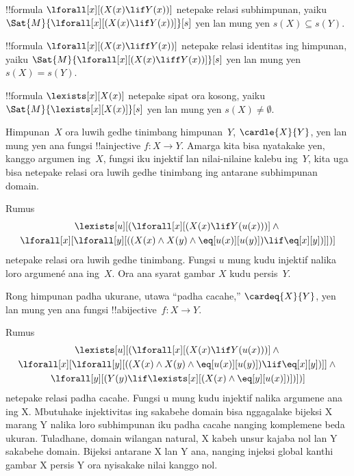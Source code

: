 \documentclass[../../../include/open-logic-section]{subfiles}
\begin{document}


\begin{prop}
!!{formula} $\lforall[x][(X(x) \lif Y(x))]$ netepake relasi
subhimpunan, yaiku
$\Sat{M}{\lforall[x][(X(x) \lif Y(x))]}[s]$
yen lan mung yen $s(X) \subseteq s(Y)$.
\end{prop}

\begin{prop}
!!{formula} $\lforall[x][(X(x) \liff Y(x))]$ netepake relasi
identitas ing himpunan, yaiku
$\Sat{M}{\lforall[x][(X(x) \liff Y(x))]}[s]$
yen lan mung yen $s(X) = s(Y)$.
\end{prop}

\begin{prop}
!!{formula} $\lexists[x][X(x)]$ netepake sipat ora kosong,
yaiku $\Sat{M}{\lexists[x][X(x)]}[s]$ yen lan mung yen
$s(X) \neq \emptyset$.
\end{prop}

Himpunan~$X$ ora luwih gedhe tinimbang himpunan~$Y$,
$\cardle{X}{Y}$, yen lan mung yen ana fungsi
!!a{injective} $f\colon X \to Y$. Amarga kita bisa
nyatakake yen, kanggo argumen ing~$X$, fungsi iku injektif
lan nilai-nilaine kalebu ing~$Y$, kita uga bisa
netepake relasi ora luwih gedhe tinimbang ing antarane
subhimpunan domain.

\begin{prop}
Rumus
\begin{multline*}
\lexists[u][(\lforall[x][(X(x) \lif Y(u(x)))] \land {}\\
\lforall[x][\lforall[y][((X(x) \land X(y) \land \eq[u(x)][u(y)]) \lif
      \eq[x][y])]])]
\end{multline*}
netepake relasi ora luwih gedhe tinimbang. Fungsi $u$ mung kudu injektif nalika loro argumené ana ing~$X$. Ora ana syarat gambar $X$ kudu persis~$Y$.
\end{prop}

Rong himpunan padha ukurane, utawa ``padha cacahe,''
$\cardeq{X}{Y}$, yen lan mung yen ana fungsi
!!a{bijective}~$f\colon X \to Y$.

\begin{prop}
Rumus
\begin{multline*}
  \lexists[u][(\lforall[x][(X(x) \lif Y(u(x)))] \land {}\\
    \lforall[x][\lforall[y][((X(x) \land X(y) \land \eq[u(x)][u(y)]) \lif \eq[x][y])]]
  \land {} \\\lforall[y][(Y(y) \lif \lexists[x][(X(x)
      \land \eq[y][u(x)])])])]
\end{multline*}
netepake relasi padha cacahe. Fungsi u mung kudu injektif nalika argumene ana ing X. Mbutuhake injektivitas ing sakabehe domain bisa nggagalake bijeksi X marang Y nalika loro subhimpunan iku padha cacahe nanging komplemene beda ukuran. Tuladhane, domain wilangan natural, X kabeh unsur kajaba nol lan Y sakabehe domain. Bijeksi antarane X lan Y ana, nanging injeksi global kanthi gambar X persis Y ora nyisakake nilai kanggo nol.
\end{prop}
\end{document}

